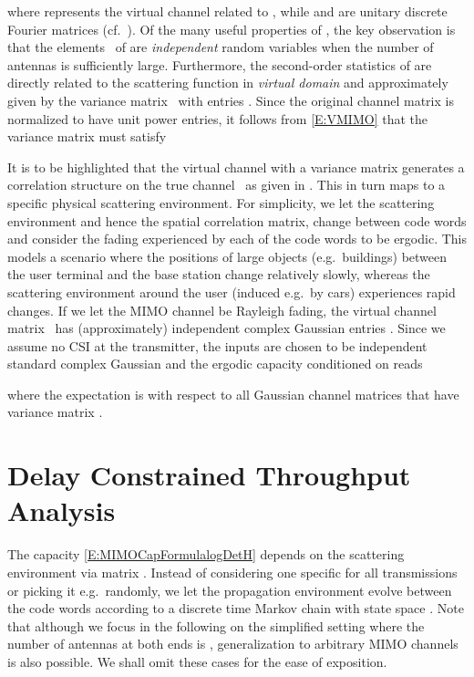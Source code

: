 \documentclass[10pt,conference]{IEEEtran}
\begin{document}
where  represents the virtual channel related to , while  and  are unitary discrete Fourier matrices
(cf.\ \cite{MIMO:Correlated:Sayeed02:Deconstructing,MIMO:Veeravalli2005:CorrelatedMIMO:Variance}).
Of the many useful properties of , the key observation is that the elements~ of  are \emph{independent} random variables when the number of antennas is sufficiently large.
Furthermore, the second-order statistics of  are directly related to the scattering function in \emph{virtual domain} and approximately given by the variance matrix~ with entries .
Since the original channel matrix  is normalized to have unit power entries, it follows from \eqref{E:VMIMO} that the variance matrix must satisfy


It is to be highlighted that the virtual channel  with a variance matrix  generates a correlation structure on the true  channel~ as given in \cite[Eq.~(9)]{Raghavan:2010:WKM}.  This in turn maps to a specific physical scattering environment.
For simplicity, we let the scattering environment and hence the spatial correlation matrix, change between code words and consider the fading experienced by each of the code words to be ergodic.  This models a scenario where the positions of large objects (e.g.\ buildings) between the user terminal and the base station change relatively slowly, whereas the scattering environment around the user (induced e.g.\ by cars)  experiences rapid changes.
If we let the MIMO channel  be Rayleigh fading, the virtual channel matrix~ has (approximately) independent complex Gaussian entries .  Since we assume no CSI at the transmitter, the inputs are chosen to be independent standard complex Gaussian and the ergodic capacity conditioned on  reads \cite{MIMO:Veeravalli2005:CorrelatedMIMO:Variance}

where the expectation is with respect to all Gaussian channel matrices  that have variance matrix .




\section{Delay Constrained Throughput Analysis}
    \label{Sec:DelayConstrainedThAnalysis}
The capacity \eqref{E:MIMOCapFormulalogDetH} depends on the scattering environment via matrix .  Instead of considering one specific  for all transmissions or picking it e.g.\ randomly, we let the propagation environment evolve between the code words according to a discrete time Markov chain with state space .  Note that although we focus in the following on the simplified setting where the number of antennas at both ends is , generalization to arbitrary  MIMO channels is also possible. We shall omit these cases for the ease of exposition.
\end{document}
